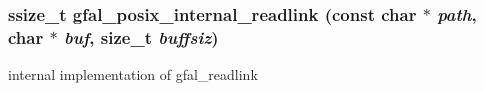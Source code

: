 \subsubsection{\setlength{\rightskip}{0pt plus 5cm}ssize\_\-t gfal\_\-posix\_\-internal\_\-readlink (const char $\ast$ {\em path}, char $\ast$ {\em buf}, size\_\-t {\em buffsiz})\hspace{0.3cm}{\tt  [inline]}}\label{gfal__posix__readlink_8c_eb0e2d14bb83951a480a411b9746dcb2}


internal implementation of gfal\_\-readlink 